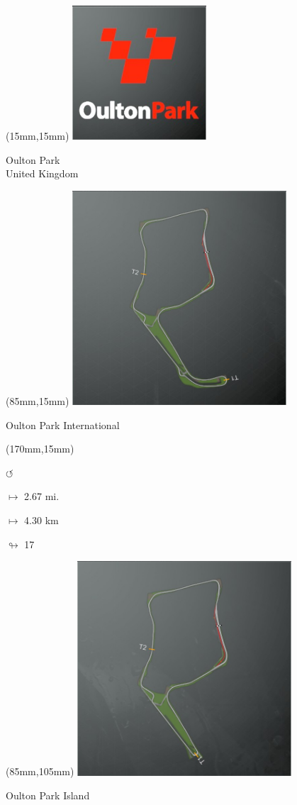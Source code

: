 \begin{textblock*}{60mm}(15mm,15mm)%
\includegraphics[width=50mm]{LG/2015-05-20_00091.png}
\par Oulton Park\\ United Kingdom
\end{textblock*}
\begin{textblock*}{80mm}(85mm,15mm)%
\includegraphics[width=80mm]{TR/2015-05-20_00048.png}
\centerline{Oulton Park International}
\end{textblock*}
\begin{textblock*}{30mm}(170mm,15mm)%
\par \Huge$\circlearrowleft$
\Large
\par$\mapsto$ 2.67 mi.
\par$\mapsto$ 4.30 km
\par$\looparrowright$ 17
\end{textblock*}
\begin{textblock*}{80mm}(85mm,105mm)%
\includegraphics[width=80mm]{TR/2015-05-20_00049.png}
\centerline{Oulton Park Island}
\end{textblock*}
